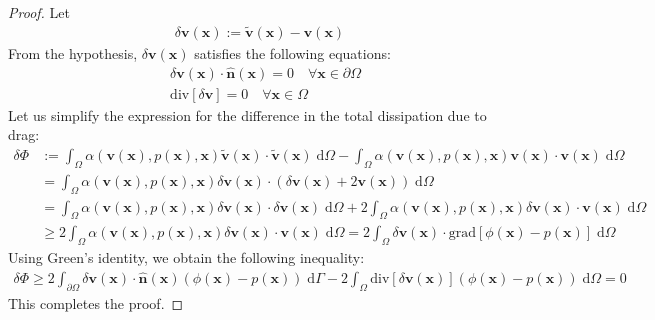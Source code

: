 \documentclass[11pt,reqno]{amsart}
\begin{document}
\begin{proof}
  Let 
  \begin{align}
    \delta \mathbf{v}(\mathbf{x}) := 
    \widetilde{\mathbf{v}}(\mathbf{x}) - 
    \mathbf{v}(\mathbf{x})
  \end{align}
From the hypothesis, $\delta \mathbf{v}(\mathbf{x})$ 
  satisfies the following equations:
  \begin{subequations}
    \begin{align}
      &\delta \mathbf{v}(\mathbf{x}) \cdot \hat{\mathbf{n}} 
      (\mathbf{x}) = 0 \quad \forall \mathbf{x} \in \partial 
      \Omega \\
&\mathrm{div}[\delta \mathbf{v}] = 0 \quad 
      \forall \mathbf{x} \in \Omega 
    \end{align}
  \end{subequations}
Let us simplify the expression for the difference 
  in the total dissipation due to drag:
  \begin{align}
    \delta \Phi &:= \int_{\Omega} \alpha(\mathbf{v}
    (\mathbf{x}),p(\mathbf{x}),\mathbf{x}) 
    \widetilde{\mathbf{v}} 
    (\mathbf{x}) \cdot \widetilde{\mathbf{v}}(\mathbf{x}) \; 
    \mathrm{d} \Omega - 
    \int_{\Omega} \alpha(\mathbf{v}(\mathbf{x}),
    p(\mathbf{x}),\mathbf{x}) \mathbf{v}(\mathbf{x}) 
    \cdot \mathbf{v}(\mathbf{x}) \; \mathrm{d} 
    \Omega \\
&= \int_{\Omega} \alpha(\mathbf{v}(\mathbf{x}),
    p(\mathbf{x}),\mathbf{x}) 
    \delta \mathbf{v}(\mathbf{x}) 
    \cdot \left(\delta \mathbf{v}(\mathbf{x}) + 2 
    \mathbf{v}(\mathbf{x}) \right) \; \mathrm{d} \Omega \\
&= \int_{\Omega} \alpha(\mathbf{v}(\mathbf{x}),
    p(\mathbf{x}),\mathbf{x}) \delta \mathbf{v}
    (\mathbf{x}) \cdot \delta \mathbf{v}(\mathbf{x}) 
    \; \mathrm{d} \Omega 
+ 2 \int_{\Omega} \alpha(\mathbf{v}(\mathbf{x}),
    p(\mathbf{x}),\mathbf{x}) \delta \mathbf{v}
    (\mathbf{x}) \cdot \mathbf{v}(\mathbf{x}) \; 
    \mathrm{d} \Omega \\
&\geq 2 \int_{\Omega} \alpha(\mathbf{v}(\mathbf{x}),
    p(\mathbf{x}),\mathbf{x}) \delta \mathbf{v}
    (\mathbf{x}) \cdot \mathbf{v}(\mathbf{x}) 
    \; \mathrm{d} \Omega = 2 \int_{\Omega} \delta \mathbf{v}
    (\mathbf{x}) \cdot \mathrm{grad}[\phi(\mathbf{x}) - 
      p(\mathbf{x})] \; \mathrm{d} \Omega
  \end{align}
Using Green's identity, we obtain the following inequality:
  \begin{align}
    \delta \Phi \geq  2 \int_{\partial \Omega} \delta \mathbf{v}
    (\mathbf{x}) \cdot \hat{\mathbf{n}}(\mathbf{x}) \left(\phi
    (\mathbf{x}) - p(\mathbf{x})\right) \; \mathrm{d} \Gamma
- 2 \int_{\Omega} \mathrm{div}[\delta \mathbf{v}
      (\mathbf{x})] \left(\phi(\mathbf{x}) - 
      p(\mathbf{x})\right) \; \mathrm{d} \Omega = 0
  \end{align}
This completes the proof.
\end{proof}
\end{document}

